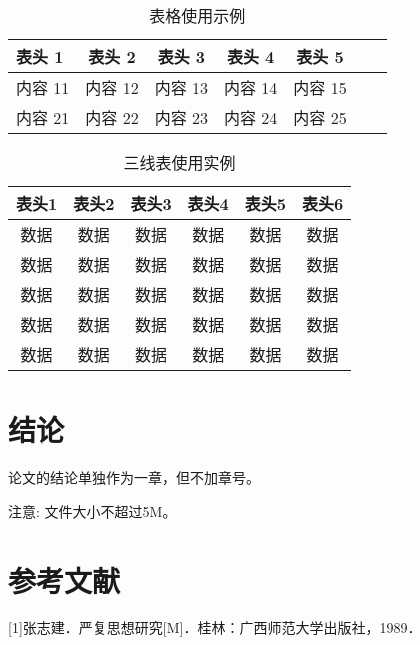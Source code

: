 \documentclass[zihao=-4]{ctexart}
\begin{document}
\begin{spacing}{1.5}

\begin{table*}[t]
\small
\centering
\caption{表格使用示例}
\begin{tabular}{|l||c|c|c|c|c|c|}
\hline
{\textbf{表头 1}}     &  表头 2 	    & 表头 3 	  & 表头 4     & 表头 5 		\\ \hline\hline
内容 11 		          & 内容 12				& 内容 13		& 内容 14 	 & 内容 15		\\ \hline
内容 21	              & 内容 22				& 内容 23		& 内容 24	   & 内容 25		\\ \hline
\end{tabular}
\end{table*}


\begin{table}[H]
\small
\caption{三线表使用实例}
\centering
\begin{tabular}{cccccc}
\hline  
\textbf{表头1} & \textbf{表头2} & \textbf{表头3} & \textbf{表头4} & \textbf{表头5} & \textbf{表头6} \\ 
\hline  
数据 & 数据  & 数据  & 数据  & 数据 & 数据\\
数据 & 数据  & 数据  & 数据  & 数据 & 数据\\
数据 & 数据  & 数据  & 数据  & 数据 & 数据\\
数据 & 数据  & 数据  & 数据  & 数据 & 数据\\
数据 & 数据  & 数据  & 数据  & 数据 & 数据\\
\hline
\end{tabular} 
\end{table}

\section*{结论}%
论文的结论单独作为一章，但不加章号。

注意: 文件大小不超过5M。

\end{spacing}

\newpage

\section*{参考文献} %
[1]张志建．严复思想研究[M]．桂林：广西师范大学出版社，1989． 
\end{document}
